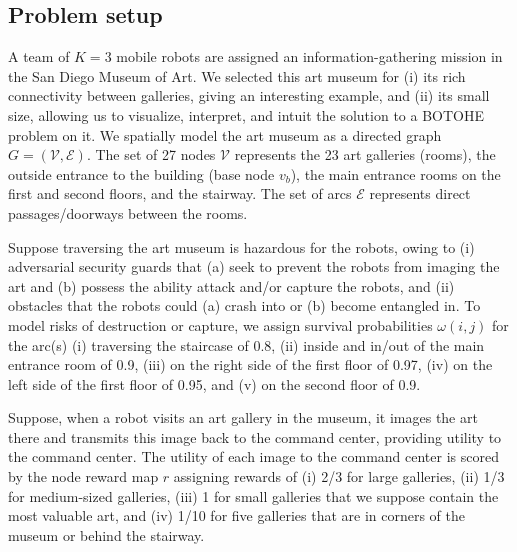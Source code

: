 \documentclass[11pt, oneside]{article}
\begin{document}
\subsection{Problem setup} 
A team of $K=3$ mobile robots are assigned an information-gathering mission in the San Diego Museum of Art. 
We selected this art museum for (i) its rich connectivity between galleries, giving an interesting example, and (ii) its small size, allowing us to visualize, interpret, and intuit the solution to a BOTOHE problem on it.
We spatially model the art museum as a directed graph $G=(\mathcal{V}, \mathcal{E})$.
The set of 27 nodes $\mathcal{V}$ represents the 23 art galleries (rooms), the outside entrance to the building (base node $v_b$), the main entrance rooms on the first and second floors, and the stairway.
The set of arcs $\mathcal{E}$ represents direct passages/doorways between the rooms. %

Suppose traversing the art museum is hazardous for the robots, owing to
(i) adversarial security guards that (a) seek to prevent the robots from imaging the art and (b) possess the ability attack and/or capture the robots, and
(ii) obstacles that the robots could (a) crash into or (b) become entangled in.
To model risks of destruction or capture, we assign survival probabilities $\omega(i,j)$ for the arc(s)
(i) traversing the staircase of 0.8,
(ii) inside and in/out of the main entrance room of 0.9,
(iii) on the right side of the first floor of 0.97,
(iv) on the left side of the first floor of 0.95,
and
(v) on the second floor of 0.9.

Suppose, when a robot visits an art gallery in the museum, it images the art there and transmits this image back to the command center, providing utility to the command center. 
The utility of each image to the command center is scored by
the node reward map $r$ assigning rewards of
(i) 2/3 for large galleries,
(ii) 1/3 for medium-sized galleries,
(iii) 1 for small galleries that we suppose contain the most valuable art, and
(iv) 1/10 for five galleries that are in corners of the museum or behind the stairway.
\end{document}
